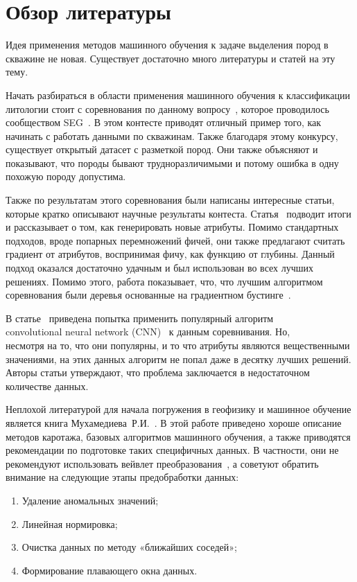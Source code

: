 \documentclass[aps,%
12pt,%
final,%
oneside,
onecolumn,%
musixtex, %
superscriptaddress,%
centertags]{article} %
\begin{document}
\section{Обзор литературы}
Идея применения методов машинного обучения к задаче выделения пород в скважине не новая. Существует достаточно много литературы и статей на эту тему.

Начать разбираться в области применения машинного обучения к классификации литологии стоит с соревнования по данному вопросу~\cite{SEG-contest}, которое проводилось сообществом SEG~\cite{SEG}. В этом контесте приводят отличный пример того, как начинать с работать данными по скважинам. Также благодаря этому конкурсу, существует открытый датасет с разметкой пород. Они также объясняют и показывают, что породы бывают трудноразличимыми и потому ошибка в одну похожую породу допустима.

Также по результатам этого соревнования были написаны интересные статьи, которые кратко описывают научные результаты контеста. Статья~\cite{Bestagini2017a} подводит итоги и рассказывает о том, как генерировать новые атрибуты. Помимо стандартных подходов, вроде попарных перемножений фичей, они также предлагают считать градиент от атрибутов, воспринимая фичу, как функцию от глубины. Данный подход оказался достаточно удачным и был использован во всех лучших решениях. Помимо этого, работа показывает, что, что лучшим алгоритмом соревнования были деревья основанные на градиентном бустинге~\cite{xgboost}.

В статье~\cite{Tschannen2017} приведена попытка применить популярный алгоритм \\ convolutional neural network (CNN)~\cite{NIPS2012_4824} к данным соревнивания. Но, \\ несмотря на то, что они популярны, и то что атрибуты являются вещественными значениями, на этих данных алгоритм не попал даже в десятку лучших решений. Авторы статьи утверждают, что проблема заключается в недостаточном количестве данных.

Неплохой литературой для начала погружения в геофизику и машинное обучение является книга Мухамедиева~Р.И.~\cite{GeophysicsMLBook}. В этой работе приведено хороше описание методов каротажа, базовых алгоритмов машинного обучения, а также приводятся рекомендации по подготовке таких специфичных данных. В частности, они не рекомендуют использовать вейвлет преобразования~\cite{Mallat:2008:WTS:1525499}, а советуют обратить внимание на следующие этапы предобработки данных:
\begin{enumerate}
  \item Удаление аномальных значений;
  \item Линейная нормировка;
  \item Очистка данных по методу «ближайших соседей»;
  \item Формирование плавающего окна данных.
\end{enumerate}
\end{document}
